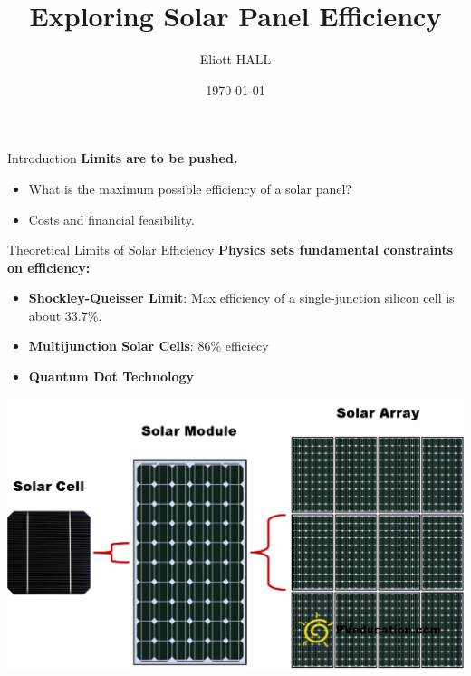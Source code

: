 \documentclass[aspectratio=169]{beamer} %
\title{Exploring Solar Panel Efficiency}
\author{Eliott HALL}
\date{\today}
\begin{document}
\frame{\titlepage}

\begin{frame}{Introduction}
    \textbf{Limits are to be pushed.}
    \begin{itemize}
        \item What is the maximum possible efficiency of a solar panel?
        \item Costs and financial feasibility.
    \end{itemize}
\end{frame}

\begin{frame}{Theoretical Limits of Solar Efficiency}
    \textbf{Physics sets fundamental constraints on efficiency:}
    \begin{itemize}
        \item \textbf{Shockley-Queisser Limit}: Max efficiency of a single-junction silicon cell is about 33.7\%.
        \item \textbf{Multijunction Solar Cells}: 86\% efficiecy
        \item \textbf{Quantum Dot Technology}
    \end{itemize}
    \centering
    \includegraphics[width=0.7\linewidth]{solar_cells.png} %
\end{frame}
\end{document}
